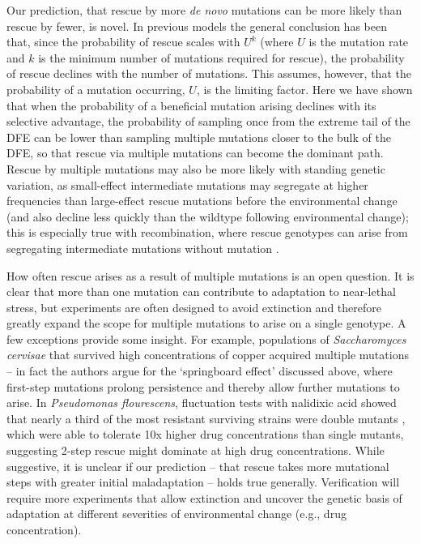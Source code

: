 \documentclass[9pt,twocolumn,twoside,lineno]{gsajnl}
\begin{document}
Our prediction, that rescue by more \textit{de novo} mutations can be more likely than rescue by fewer, is novel.
In previous models \citep[e.g.,][]{Antia2003,Iwasa2004,Alexander2010} the general conclusion has been that, since the probability of rescue scales with $U^k$ (where $U$ is the mutation rate and $k$ is the minimum number of mutations required for rescue), the probability of rescue declines with the number of mutations.
This assumes, however, that the probability of a mutation occurring, $U$, is the limiting factor.
Here we have shown that when the probability of a beneficial mutation arising declines with its selective advantage, the probability of sampling once from the extreme tail of the DFE can be lower than sampling multiple mutations closer to the bulk of the DFE, so that rescue via multiple mutations can become the dominant path.
Rescue by multiple mutations may also be more likely with standing genetic variation, as small-effect intermediate mutations may segregate at higher frequencies than large-effect rescue mutations before the environmental change (and also decline less quickly than the wildtype following environmental change); this is especially true with recombination, where rescue genotypes can arise from segregating intermediate mutations without mutation \citep{Uecker2016}.  

How often rescue arises as a result of multiple mutations is an open question. 
It is clear that more than one mutation can contribute to adaptation to near-lethal stress, but experiments are often designed to avoid extinction \citep[reviewed in][]{cowen2002evolution} and therefore greatly expand the scope for multiple mutations to arise on a single genotype.
A few exceptions provide some insight.
For example, populations of \textit{Saccharomyces cervisae} that survived high concentrations of copper acquired multiple mutations \citep{Gerstein2015} -- in fact the authors argue for the `springboard effect' discussed above, where first-step mutations prolong persistence and thereby allow further mutations to arise.
In \textit{Pseudomonas flourescens}, fluctuation tests with nalidixic acid showed that nearly a third of the most resistant surviving strains were double mutants \citep{Bataillon2011}, which were able to tolerate 10x higher drug concentrations than single mutants, suggesting 2-step rescue might dominate at high drug concentrations.
While suggestive, it is unclear if our prediction --  that rescue takes more mutational steps with greater initial maladaptation -- holds true generally. 
Verification will require more experiments that allow extinction and uncover the genetic basis of adaptation at different severities of environmental change (e.g., drug concentration).
\end{document}
